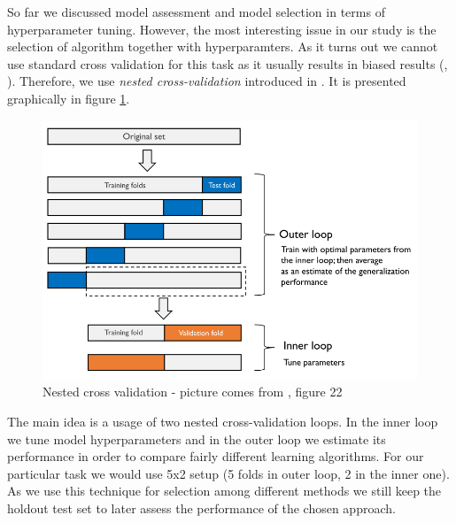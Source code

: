 \documentclass[shortabstract, english, mgr]{iithesis}
\begin{document}
So far we discussed model assessment and model selection in terms of hyperparameter tuning. However, the most interesting issue in our study is the selection of algorithm together with hyperparamters. As it turns out we cannot use standard cross validation for this task as it usually results in biased results (\cite{ModelSelection}, \cite{cvOverfit}). Therefore, we use \textit{nested cross-validation} introduced in \cite{nestedCV}. It is presented graphically in figure \ref{fig:nestedCV}.

\begin{figure}
\centering
\includegraphics[width=\textwidth]{images/nestedCV.png}
\caption{Nested cross validation - picture comes from \cite{ModelSelection}, figure 22}
\label{fig:nestedCV}
\end{figure}

The main idea is a usage of two nested cross-validation loops. In the inner loop we tune model hyperparameters and in the outer loop we estimate its performance in order to compare fairly different learning algorithms. For our particular task we would use 5x2 setup (5 folds in outer loop, 2 in the inner one). As we use this technique for selection among different methods we still keep the holdout test set to later assess the performance of the chosen approach.
\end{document}
